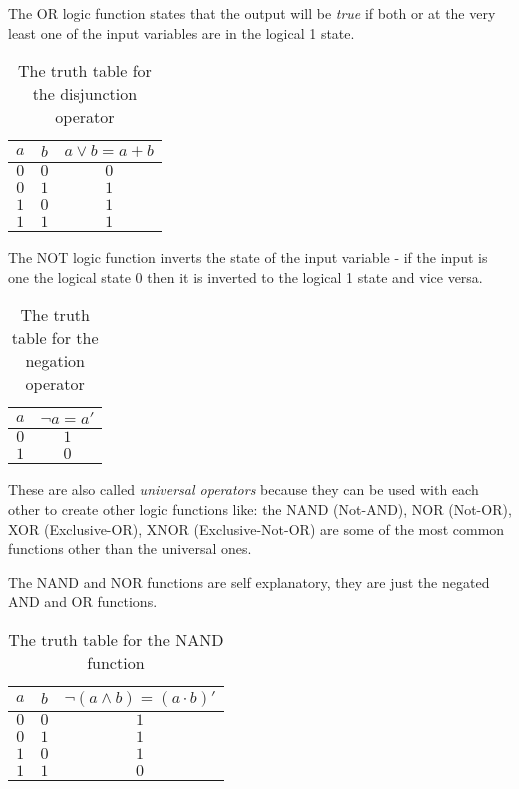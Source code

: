 The OR logic function states that the output will be \textit{true} if both or at the very least
one of the input variables are in the logical 1 state.
\begin{table}[ht]
    \centering
    \begin{tabular}{cc|c}
        $a$ & $b$ & $a \lor b = a + b$ \\
        \hline
        $0$ & $0$ & $0$ \\
        $0$ & $1$ & $1$ \\
        $1$ & $0$ & $1$ \\
        $1$ & $1$ & $1$ \\
    \end{tabular}
    \caption{The truth table for the disjunction operator}
\end{table}

The NOT logic function inverts the state of the input variable - if the input is one the logical
state 0 then it is inverted to the logical 1 state and vice versa.
\begin{table}[ht]
    \centering
    \begin{tabular}{c|c}
        $a$ & $\lnot a = a'$ \\
        \hline
        $0$ & $1$ \\
        $1$ & $0$ \\
    \end{tabular}
    \caption{The truth table for the negation operator}
\end{table}

These are also called \textit{universal operators} because they can be used with each other to create
other logic functions like: the NAND (Not-AND), NOR (Not-OR), XOR (Exclusive-OR), XNOR (Exclusive-Not-OR)
are some of the most common functions other than the universal ones.

The NAND and NOR functions are self explanatory, they are just the negated AND and OR functions.
\begin{table}[ht]
    \centering
    \begin{tabular}{cc|c}
        $a$ & $b$ & $\lnot(a \land b) = (a \cdot b)'$ \\
        \hline
        $0$ & $0$ & $1$ \\
        $0$ & $1$ & $1$ \\
        $1$ & $0$ & $1$ \\
        $1$ & $1$ & $0$ \\
    \end{tabular}
    \caption{The truth table for the NAND function}
\end{table}

